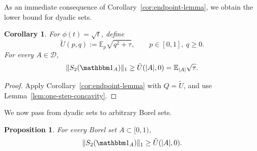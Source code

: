 \documentclass[11pt]{amsart}
\newtheorem{proposition}[theorem]{Proposition}
\newtheorem{corollary}[theorem]{Corollary}
\theoremstyle{definition}
\newtheorem{remark}[theorem]{Remark}
\renewcommand{\1}{{\mathbbm{1}}}
\begin{document}





As an immediate consequence of Corollary~\ref{cor:endpoint-lemma}, we obtain the lower bound for dyadic sets.

\begin{corollary}\label{cor:dyadic-lowerbound-S2}
For $\phi(t) = \sqrt{t}$, define
\begin{equation}\label{eq:Utilde-def}
\tilde U(p,q):=\mathbb E_p\sqrt{q^2+\tau},
\qquad p\in[0,1],\ q\ge0.
\end{equation}
For every $A\in\mathcal D$,
\[
\|S_2(\mathbbm 1_A)\|_1\ge \tilde U(|A|,0)=\mathbb E_{|A|}\sqrt{\tau}.
\]
\end{corollary}

\begin{proof}
Apply Corollary~\ref{cor:endpoint-lemma} with $Q=\tilde U$, and use Lemma~\ref{lem:one-step-concavity}.
\end{proof}

We now pass from dyadic sets to arbitrary Borel sets.

\begin{proposition}\label{prop:borel-extension-S2}
For every Borel set $A\subset{[0,1)}$,
\[
\|S_2(\mathbbm 1_A)\|_1\ge \tilde U(|A|,0).
\]
\end{proposition}
\end{document}
